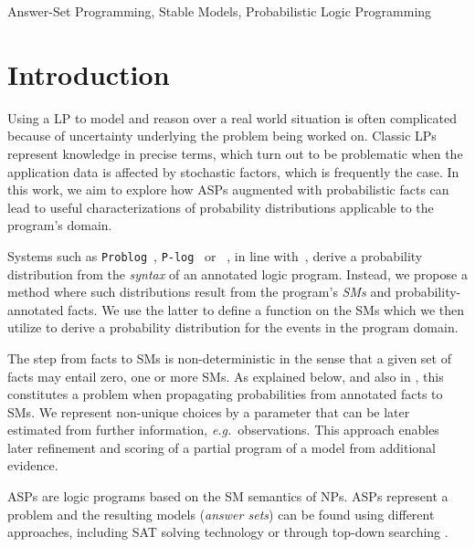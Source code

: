 \documentclass[x11names]{tlp}
\renewcommand{\cite}{\citep}
\begin{document}
\begin{keywords}
	Answer-Set Programming, Stable Models,
	Probabilistic Logic Programming
\end{keywords}

\section{Introduction}
\label{sec:introduction}

Using a \acl{LP} to model and reason over a real world situation is often
complicated because of uncertainty underlying the problem being worked on.
Classic \aclp{LP} represent knowledge in precise terms, which turn out to be
problematic when the application data is affected by stochastic factors,
which is frequently the case.
In this work, we aim to explore how \aclp{ASP} augmented with probabilistic
facts can lead to useful characterizations of probability distributions
applicable to the program's domain.

Systems such as \texttt{Problog}~\cite{de2007problog},
\texttt{P-log}~\cite{baral2009probabilistic} or
\lpmln~\cite{lee2016weighted}, in line with~\cite{kifer1992theory}, derive a
probability distribution from the \textit{syntax} of an annotated logic
program. Instead, we propose a method where such distributions result from
the program's \textit{\acp{SM}} and probability-annotated facts. We use the
latter to define a function on the \acp{SM} which we then utilize to derive a
probability distribution for the events in the program domain.

The step from facts to \aclp{SM} is non-deterministic in the sense that a
given set of facts may entail zero, one or more \acp{SM}. As explained below,
and also in
\cite{verreet2022inference,pajunen2021solution,cozman2020joy,baral2009probabilistic},
this constitutes a problem when propagating probabilities from annotated
facts to \aclp{SM}. We represent non-unique choices by a parameter that can
be later estimated from further information, \emph{e.g.}\ observations. This
approach enables later refinement and scoring of a partial program of a model
from additional evidence.

\Acp{ASP} \cite{lifschitz2002answer,lifschitz2008twelve} are logic
programs based on the \acl{SM} semantics of \acp{NP}.  \Acp{ASP}
represent a problem and the resulting models (\emph{answer sets}) can
be found using different approaches, including SAT solving technology
\cite{gebser2011potassco,adrian2018asp,niemela1997smodels} or through
top-down searching
\cite{alberti2017cplint,arias2020justifications,marple2017computing}.
\end{document}
